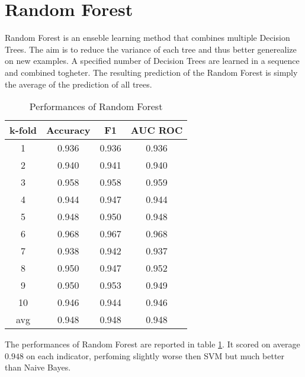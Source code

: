 \section{Random Forest}
\label{sec:random_forest}

Random Forest is an enseble learning method that combines multiple Decision Trees.
The aim is to reduce the variance of each tree and thus better generealize on new examples.
A specified number of Decision Trees are learned in a sequence and combined togheter.
The resulting prediction of the Random Forest is simply the average of the prediction of all trees.

\begin{table}
	\centering
	\caption{Performances of Random Forest}
	\label{tab:random_forest}
	\begin{tabular}{cccc}
		\toprule
			\multicolumn{1}{c}{k-fold} &
			\multicolumn{1}{c}{Accuracy} &
			\multicolumn{1}{c}{F1} &
			\multicolumn{1}{c}{AUC ROC} \\
		\midrule
			  1  & 0.936 & 0.936 & 0.936 \\
			  2  & 0.940 & 0.941 & 0.940 \\
			  3  & 0.958 & 0.958 & 0.959 \\
			  4  & 0.944 & 0.947 & 0.944 \\
			  5  & 0.948 & 0.950 & 0.948 \\
			  6  & 0.968 & 0.967 & 0.968 \\
			  7  & 0.938 & 0.942 & 0.937 \\
			  8  & 0.950 & 0.947 & 0.952 \\
			  9  & 0.950 & 0.953 & 0.949 \\
			 10  & 0.946 & 0.944 & 0.946 \\[2pt]
			\hline
			 avg & 0.948 & 0.948 & 0.948 \Tstrut\Bstrut\\
		\bottomrule
	\end{tabular}
\end{table}

The performances of Random Forest are reported in table \cref{tab:random_forest}.
It scored on average $0.948$ on each indicator, perfoming slightly worse then \ac{SVM} but much better than Naive Bayes.
